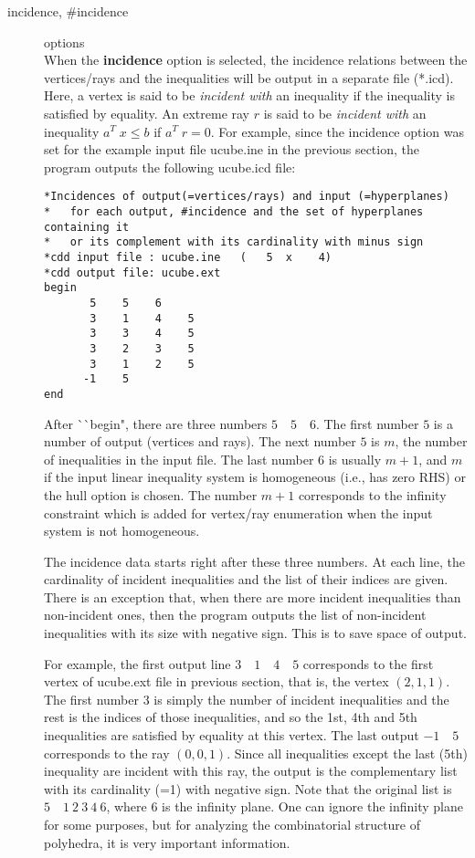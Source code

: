 \begin{description}
\item[incidence, \#incidence] options\\
When the {\bf incidence} option is selected, the incidence relations between
the vertices/rays and the inequalities will be output
in a separate file (*.icd).  Here, a vertex is said to be 
{\em incident with\/} an inequality if the inequality is satisfied by equality.
An extreme ray $r$ is said to be {\em incident with\/} 
an inequality $a^T \; x \le b$ if  $a^T \; r = 0$.  For example,
since the incidence option was set for the example input file ucube.ine in
the previous section, the program outputs the following ucube.icd file:
\begin{verbatim}
*Incidences of output(=vertices/rays) and input (=hyperplanes)
*   for each output, #incidence and the set of hyperplanes containing it
*   or its complement with its cardinality with minus sign
*cdd input file : ucube.ine   (   5  x    4)
*cdd output file: ucube.ext
begin
       5    5    6
       3    1    4    5
       3    3    4    5
       3    2    3    5
       3    1    2    5
      -1    5
end
\end{verbatim}
After ^^ ^^ begin", there are three numbers $5 \quad 5 \quad 6$.
The first number $5$ is a number of output (vertices and rays).
The next number $5$ is $m$, the number of inequalities in the input file.
The last number $6$ is usually $m+1$, and $m$ if the input linear inequality
system is homogeneous (i.e., has zero RHS) or the hull option is chosen.
The number $m+1$ corresponds to the infinity constraint which is added
for vertex/ray enumeration when the input system is not homogeneous.

The incidence data starts right after these three numbers.
At each line, the cardinality of incident inequalities and
the list of their indices are given.  There is an exception that, when
there are more incident inequalities than non-incident ones, then the program
outputs the list of non-incident inequalities with its
size with negative sign.  This is to save space of output.

For example, the first output line $3 \quad 1 \quad 4 \quad 5$ 
corresponds to the
first vertex of ucube.ext file in previous section, that is, 
the vertex $(2, 1, 1)$.  The first number $3$ is simply the number
of incident inequalities and the rest is the indices of
those inequalities, and so the 1st, 4th and 5th inequalities are
satisfied by equality at this vertex.   The last output
$-1 \quad 5$ corresponds to the ray  $(0,0,1)$.  Since all inequalities
except the last (5th) inequality are incident with this ray,
the output is the complementary list with its cardinality (=1) with negative
sign.  Note that the original list is $5 \quad 1 \: 2 \: 3 \: 4 \: 6$, where
$6$ is the infinity plane.  One can ignore the infinity
plane for some purposes,  but for analyzing the combinatorial 
structure of polyhedra, it is
very important information.


\end{description}
